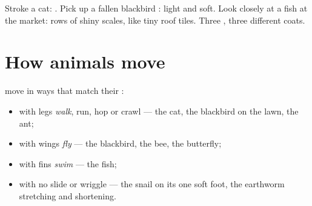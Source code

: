 \begin{example}\label{ex:g1:animals-around-us:covering}
Stroke a cat: . Pick up a fallen blackbird : light and
soft. Look closely at a fish at the market: rows of shiny scales,
like tiny roof tiles. Three , three different coats.
\end{example}

\section{How animals move}

\begin{proposition}\label{prop:g1:animals-around-us:moving}
 move in ways that match their :
\begin{itemize}
  \item {} with legs \emph{walk}, run, hop or crawl --- the
        cat, the blackbird on the lawn, the ant;
  \item {} with wings \emph{fly} --- the blackbird,
        the bee, the butterfly;
  \item {} with fins \emph{swim} --- the fish;
  \item {} with no  slide or wriggle --- the snail on its
        one soft foot, the earthworm stretching and shortening.
\end{itemize}
\end{proposition}
\admitted

